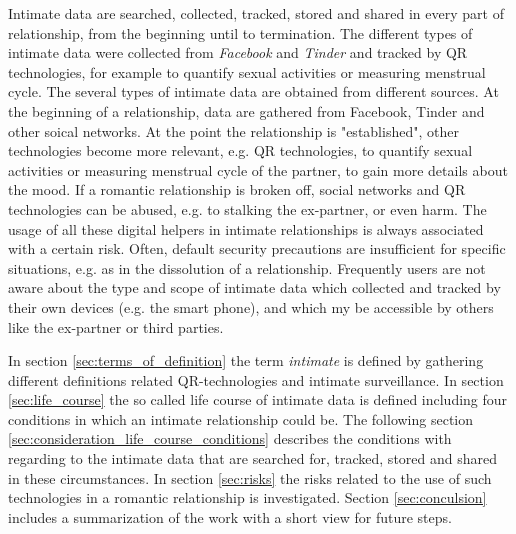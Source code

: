 Intimate data are searched, collected, tracked, stored and shared in every part of relationship, from the beginning until to termination.
The different types of intimate data were collected from \textit{Facebook} and \textit{Tinder} and tracked by \acl{QR} technologies, for example to quantify sexual activities or measuring menstrual cycle.
The several types of intimate data are obtained from different sources. At the beginning of a relationship, data are gathered from Facebook, Tinder and other soical networks.
At the point the relationship is "established", other technologies become more relevant, e.g. \acl{QR} technologies, to quantify sexual activities or measuring menstrual cycle of the partner, to gain more details about the mood.
If a romantic relationship is broken off, social networks and \acl{QR} technologies can be abused, e.g. to stalking the ex-partner, or even harm. 
The usage of all these digital helpers in intimate relationships is always associated with a certain risk.
Often, default security precautions are insufficient for specific situations, e.g. as in the dissolution of a relationship. 
Frequently users are not aware about the type and scope of intimate data which collected and tracked by their own devices (e.g. the smart phone), and which my be accessible by others like the ex-partner or third parties.

In section \ref{sec:terms_of_definition} the term \textit{intimate} is defined by gathering different definitions related \acl{QR}-technologies and intimate surveillance.
In section \ref{sec:life_course} the so called life course of intimate data is defined including four conditions in which an intimate relationship could be.
The following section \ref{sec:consideration_life_course_conditions} describes the conditions with regarding to the intimate data that are searched for, tracked, stored and shared in these circumstances.
In section \ref{sec:risks} the risks related to the use of such technologies in a romantic relationship is investigated.
Section \ref{sec:conculsion} includes a summarization of the work with a short view for future steps.
